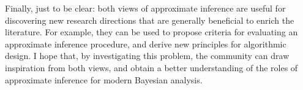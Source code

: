 Finally, just to be clear: both views of approximate inference are useful for discovering new research directions that are generally beneficial to enrich the literature. For example, they can be used to propose criteria for evaluating an approximate inference procedure, and derive new principles for algorithmic design. I hope that, by investigating this problem, the community can draw inspiration from both views, and obtain a better understanding of the roles of approximate inference for modern Bayesian analysis.
